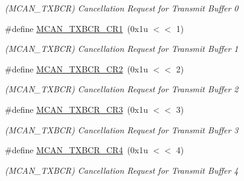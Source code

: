 \begin{DoxyCompactItemize}
\begin{DoxyCompactList}\small\item\em (M\+C\+A\+N\+\_\+\+T\+X\+B\+CR) Cancellation Request for Transmit Buffer 0 \end{DoxyCompactList}\item 
\mbox{\label{group__SAME70__MCAN_ga2889829596b3754ebaf2721027155a5c}} 
\#define \mbox{\hyperlink{group__SAME70__MCAN_ga2889829596b3754ebaf2721027155a5c}{M\+C\+A\+N\+\_\+\+T\+X\+B\+C\+R\+\_\+\+C\+R1}}~(0x1u $<$$<$ 1)
\begin{DoxyCompactList}\small\item\em (M\+C\+A\+N\+\_\+\+T\+X\+B\+CR) Cancellation Request for Transmit Buffer 1 \end{DoxyCompactList}\item 
\mbox{\label{group__SAME70__MCAN_gaac55cf064292e7e7d7af4f20d0ce547a}} 
\#define \mbox{\hyperlink{group__SAME70__MCAN_gaac55cf064292e7e7d7af4f20d0ce547a}{M\+C\+A\+N\+\_\+\+T\+X\+B\+C\+R\+\_\+\+C\+R2}}~(0x1u $<$$<$ 2)
\begin{DoxyCompactList}\small\item\em (M\+C\+A\+N\+\_\+\+T\+X\+B\+CR) Cancellation Request for Transmit Buffer 2 \end{DoxyCompactList}\item 
\mbox{\label{group__SAME70__MCAN_ga18d3b7cd8f0a0fb3ac75492db467ee9d}} 
\#define \mbox{\hyperlink{group__SAME70__MCAN_ga18d3b7cd8f0a0fb3ac75492db467ee9d}{M\+C\+A\+N\+\_\+\+T\+X\+B\+C\+R\+\_\+\+C\+R3}}~(0x1u $<$$<$ 3)
\begin{DoxyCompactList}\small\item\em (M\+C\+A\+N\+\_\+\+T\+X\+B\+CR) Cancellation Request for Transmit Buffer 3 \end{DoxyCompactList}\item 
\mbox{\label{group__SAME70__MCAN_ga896817926cae28731f387934fbe85c4e}} 
\#define \mbox{\hyperlink{group__SAME70__MCAN_ga896817926cae28731f387934fbe85c4e}{M\+C\+A\+N\+\_\+\+T\+X\+B\+C\+R\+\_\+\+C\+R4}}~(0x1u $<$$<$ 4)
\begin{DoxyCompactList}\small\item\em (M\+C\+A\+N\+\_\+\+T\+X\+B\+CR) Cancellation Request for Transmit Buffer 4 \end{DoxyCompactList}\item 

\end{DoxyCompactItemize}
